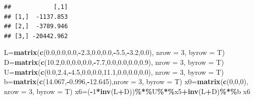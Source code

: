 \documentclass[
]{article}
\newenvironment{Shaded}{\begin{snugshade}}{\end{snugshade}}
\newcommand{\AttributeTok}[1]{\textcolor[rgb]{0.13,0.29,0.53}{#1}}
\newcommand{\DecValTok}[1]{\textcolor[rgb]{0.00,0.00,0.81}{#1}}
\newcommand{\FloatTok}[1]{\textcolor[rgb]{0.00,0.00,0.81}{#1}}
\newcommand{\FunctionTok}[1]{\textcolor[rgb]{0.13,0.29,0.53}{\textbf{#1}}}
\newcommand{\NormalTok}[1]{#1}
\newcommand{\OtherTok}[1]{\textcolor[rgb]{0.56,0.35,0.01}{#1}}
\newcommand{\SpecialCharTok}[1]{\textcolor[rgb]{0.81,0.36,0.00}{\textbf{#1}}}
\begin{document}
\begin{verbatim}
##            [,1]
## [1,]  -1137.853
## [2,]  -3789.946
## [3,] -20442.962
\end{verbatim}

\begin{Shaded}
\begin{Highlighting}[]
\NormalTok{  L}\OtherTok{=}\FunctionTok{matrix}\NormalTok{(}\FunctionTok{c}\NormalTok{(}\FloatTok{0.0}\NormalTok{,}\FloatTok{0.0}\NormalTok{,}\FloatTok{0.0}\NormalTok{,}\SpecialCharTok{{-}}\FloatTok{2.3}\NormalTok{,}\FloatTok{0.0}\NormalTok{,}\FloatTok{0.0}\NormalTok{,}\SpecialCharTok{{-}}\FloatTok{5.5}\NormalTok{,}\SpecialCharTok{{-}}\FloatTok{3.2}\NormalTok{,}\FloatTok{0.0}\NormalTok{), }\AttributeTok{nrow =} \DecValTok{3}\NormalTok{, }\AttributeTok{byrow =}\NormalTok{ T)}
\NormalTok{  D}\OtherTok{=}\FunctionTok{matrix}\NormalTok{(}\FunctionTok{c}\NormalTok{(}\FloatTok{10.2}\NormalTok{,}\FloatTok{0.0}\NormalTok{,}\FloatTok{0.0}\NormalTok{,}\FloatTok{0.0}\NormalTok{,}\SpecialCharTok{{-}}\FloatTok{7.7}\NormalTok{,}\FloatTok{0.0}\NormalTok{,}\FloatTok{0.0}\NormalTok{,}\FloatTok{0.0}\NormalTok{,}\FloatTok{0.9}\NormalTok{), }\AttributeTok{nrow =} \DecValTok{3}\NormalTok{, }\AttributeTok{byrow =}\NormalTok{ T)}
\NormalTok{  U}\OtherTok{=}\FunctionTok{matrix}\NormalTok{(}\FunctionTok{c}\NormalTok{(}\FloatTok{0.0}\NormalTok{,}\FloatTok{2.4}\NormalTok{,}\SpecialCharTok{{-}}\FloatTok{4.5}\NormalTok{,}\FloatTok{0.0}\NormalTok{,}\FloatTok{0.0}\NormalTok{,}\FloatTok{11.1}\NormalTok{,}\FloatTok{0.0}\NormalTok{,}\FloatTok{0.0}\NormalTok{,}\FloatTok{0.0}\NormalTok{), }\AttributeTok{nrow =} \DecValTok{3}\NormalTok{, }\AttributeTok{byrow =}\NormalTok{ T)}
\NormalTok{  b}\OtherTok{=}\FunctionTok{matrix}\NormalTok{(}\FunctionTok{c}\NormalTok{(}\FloatTok{14.067}\NormalTok{,}\SpecialCharTok{{-}}\FloatTok{0.996}\NormalTok{,}\SpecialCharTok{{-}}\FloatTok{12.645}\NormalTok{),}\AttributeTok{nrow =} \DecValTok{3}\NormalTok{, }\AttributeTok{byrow =}\NormalTok{ T)}
\NormalTok{  x0}\OtherTok{=}\FunctionTok{matrix}\NormalTok{(}\FunctionTok{c}\NormalTok{(}\DecValTok{0}\NormalTok{,}\DecValTok{0}\NormalTok{,}\DecValTok{0}\NormalTok{), }\AttributeTok{nrow =} \DecValTok{3}\NormalTok{, }\AttributeTok{byrow =}\NormalTok{ T)}
\NormalTok{ x6}\OtherTok{=}\NormalTok{(}\SpecialCharTok{{-}}\DecValTok{1}\SpecialCharTok{*}\FunctionTok{inv}\NormalTok{(L}\SpecialCharTok{+}\NormalTok{D))}\SpecialCharTok{\%*\%}\NormalTok{U}\SpecialCharTok{\%*\%}\NormalTok{x5}\SpecialCharTok{+}\FunctionTok{inv}\NormalTok{(L}\SpecialCharTok{+}\NormalTok{D)}\SpecialCharTok{\%*\%}\NormalTok{b}
\NormalTok{x6}
\end{Highlighting}
\end{Shaded}
\end{document}
